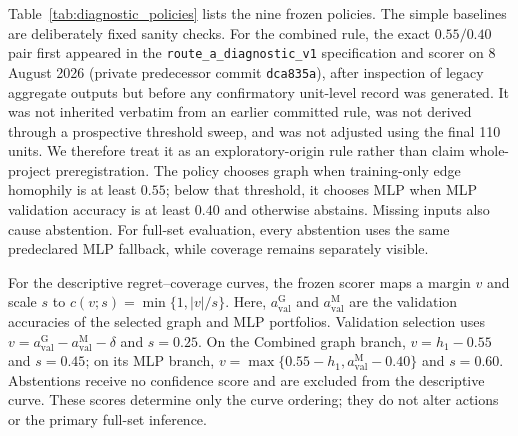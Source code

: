 Table~\ref{tab:diagnostic_policies} lists the nine frozen policies. The simple baselines are deliberately fixed sanity checks. For the combined rule, the exact $0.55/0.40$ pair first appeared in the \texttt{route\_a\_diagnostic\_v1} specification and scorer on 8 August 2026 (private predecessor commit \texttt{dca835a}), after inspection of legacy aggregate outputs but before any confirmatory unit-level record was generated. It was not inherited verbatim from an earlier committed rule, was not derived through a prospective threshold sweep, and was not adjusted using the final 110 units. We therefore treat it as an exploratory-origin rule rather than claim whole-project preregistration. The policy chooses graph when training-only edge homophily is at least $0.55$; below that threshold, it chooses MLP when MLP validation accuracy is at least $0.40$ and otherwise abstains. Missing inputs also cause abstention. For full-set evaluation, every abstention uses the same predeclared MLP fallback, while coverage remains separately visible.

For the descriptive regret--coverage curves, the frozen scorer maps a margin $v$ and scale $s$ to $c(v;s)=\min\{1,|v|/s\}$. Here, $a_{\mathrm{val}}^{\mathrm{G}}$ and $a_{\mathrm{val}}^{\mathrm{M}}$ are the validation accuracies of the selected graph and MLP portfolios. Validation selection uses $v=a_{\mathrm{val}}^{\mathrm{G}}-a_{\mathrm{val}}^{\mathrm{M}}-\delta$ and $s=0.25$. On the Combined graph branch, $v=h_1-0.55$ and $s=0.45$; on its MLP branch, $v=\max\{0.55-h_1,a_{\mathrm{val}}^{\mathrm{M}}-0.40\}$ and $s=0.60$. Abstentions receive no confidence score and are excluded from the descriptive curve. These scores determine only the curve ordering; they do not alter actions or the primary full-set inference.

